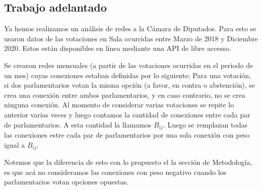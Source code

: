 \documentclass{proyectotesis}
\begin{document}
\subsection{Trabajo adelantado}
Ya hemos realizamos un análisis de redes a la Cámara de Diputados. Para esto se usaron datos de las votaciones en Sala ocurridas entre Marzo de 2018 y Diciembre 2020. Estos están disponibles en línea mediante una API de libre accesso. 

Se crearon redes mensuales (a partir de las votaciones ocurridas en el periodo de un mes) cuyas conexiones estaban definidas por lo siguiente: Para una votación, si dos parlamentarios votan la misma opción (a favor, en contra o  abstención), se crea una conexión entre ambos parlamentarios, y en caso contrario, no se crea ninguna conexión. Al momento de considerar varias votaciones se repite lo anterior varias veces y luego contamos la cantidad de conexiones entre cada par de parlamentarios. A esta cantidad la llamamos $B_{ij}$. Luego se remplazan todas las conexiones estre cada par de parlamentarios por una sola conexión con peso igual a $B_{ij}$.

Notemos que la diferencia de esto con lo propuesto el la sección de Metodología, es que acá no consideramos las conexiones con peso negativo cuando los parlamentarios votan opciones opuestas. \\
\end{document}
